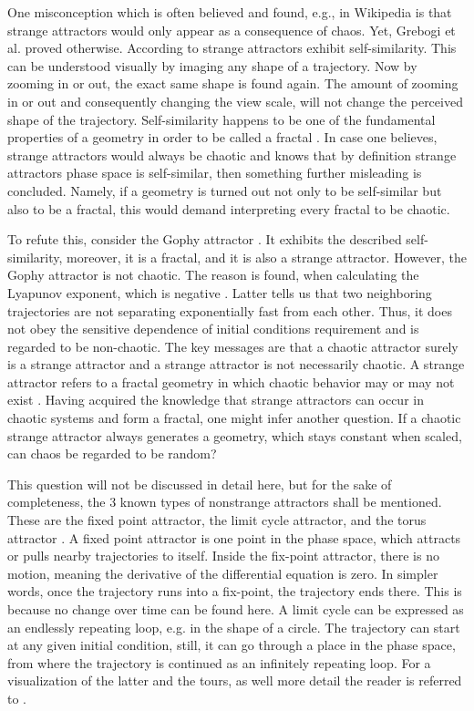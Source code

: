 One misconception which is often believed \cite{Taylor2010} 
and found, e.g., in
Wikipedia \cite{Wiki_Chaos} is that
strange attractors would only appear as a consequence of 
chaos. Yet, Grebogi et al. \cite{Grebogi1984} proved
otherwise. According to 
\cite{Boeing2016,Taylor2010} strange attractors exhibit 
self-similarity. This can be understood visually by imaging any shape 
of a trajectory. Now by zooming in or out, the exact same shape 
is found again. The amount of zooming in or out and consequently 
changing the view scale, will not change the perceived 
shape of the trajectory. Self-similarity happens to be
one of the fundamental properties of a geometry 
in order to be called a fractal \cite{Taylor2010}. 
In case one believes,
strange attractors would always be chaotic and knows that by definition strange attractors phase 
space is self-similar, then 
something further misleading is concluded.
Namely, if a geometry is turned out not only
to be self-similar but also to be a fractal, this 
would demand interpreting every fractal to be
chaotic. \newline 

To refute this, consider the Gophy 
attractor \cite{Grebogi1984}. 
It exhibits the described self-similarity,  
moreover, it is a fractal, and it is also a 
strange attractor. However, the Gophy 
attractor is not chaotic. The reason is found, when 
calculating the Lyapunov exponent, which is negative
\cite{Taylor2010}. Latter tells us that two neighboring 
trajectories are not separating exponentially fast 
from each other. Thus, it does not obey the 
sensitive dependence 
of initial conditions requirement and is 
regarded to be non-chaotic. The key messages are 
that a chaotic attractor surely is a strange 
attractor and a strange attractor is not necessarily 
chaotic. A strange attractor refers to a fractal
geometry in which chaotic behavior may
or may not exist \cite{Taylor2010}. 
Having acquired the knowledge that strange attractors 
can occur in chaotic systems and form a fractal, 
one might infer another question. If a chaotic 
strange attractor always generates a geometry, which 
stays constant when scaled, can chaos be 
regarded to be random?\newline 


This question will not be discussed in detail here, but for the sake of completeness, the 3 known types of nonstrange attractors 
shall be mentioned. These are
the fixed point attractor, the limit cycle attractor, and the
torus attractor \cite{Taylor2010}. 
A fixed point attractor is one point in the phase space, which attracts or pulls nearby trajectories to itself. 
Inside the fix-point attractor, there is no motion, meaning 
the derivative of the differential equation is zero. 
In simpler words,
once the trajectory runs into a fix-point, the trajectory ends there. 
This is because no change over time can be found here. 
A limit cycle can be expressed as an endlessly repeating loop, e.g. in the shape of a circle. 
The trajectory can start at
any given initial condition, still, it can go through a place in the phase space, from where the trajectory is continued as an infinitely
repeating loop. 
For a visualization of the latter and the tours, as well more 
detail the reader is referred to \cite{Argyris2017, Kutz2022, Strogatz2019, Taylor2010}.